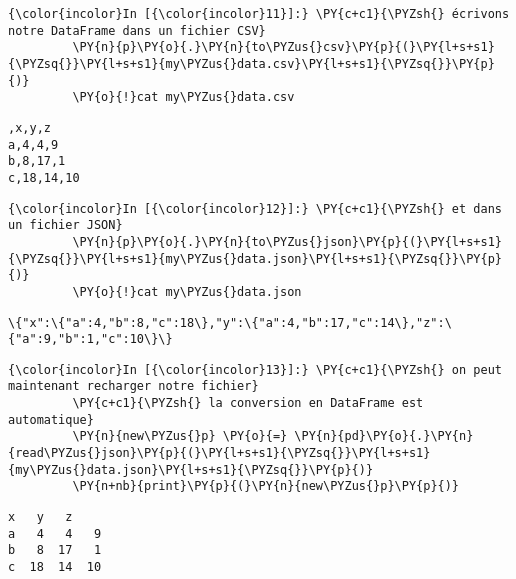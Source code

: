     \begin{Verbatim}[commandchars=\\\{\},frame=single,framerule=0.3mm,rulecolor=\color{cellframecolor}]
{\color{incolor}In [{\color{incolor}11}]:} \PY{c+c1}{\PYZsh{} écrivons notre DataFrame dans un fichier CSV}
         \PY{n}{p}\PY{o}{.}\PY{n}{to\PYZus{}csv}\PY{p}{(}\PY{l+s+s1}{\PYZsq{}}\PY{l+s+s1}{my\PYZus{}data.csv}\PY{l+s+s1}{\PYZsq{}}\PY{p}{)}
         \PY{o}{!}cat my\PYZus{}data.csv
\end{Verbatim}


    \begin{Verbatim}[commandchars=\\\{\},frame=single,framerule=0.3mm,rulecolor=\color{cellframecolor}]
,x,y,z
a,4,4,9
b,8,17,1
c,18,14,10
\end{Verbatim}

    \begin{Verbatim}[commandchars=\\\{\},frame=single,framerule=0.3mm,rulecolor=\color{cellframecolor}]
{\color{incolor}In [{\color{incolor}12}]:} \PY{c+c1}{\PYZsh{} et dans un fichier JSON}
         \PY{n}{p}\PY{o}{.}\PY{n}{to\PYZus{}json}\PY{p}{(}\PY{l+s+s1}{\PYZsq{}}\PY{l+s+s1}{my\PYZus{}data.json}\PY{l+s+s1}{\PYZsq{}}\PY{p}{)}
         \PY{o}{!}cat my\PYZus{}data.json
\end{Verbatim}


    \begin{Verbatim}[commandchars=\\\{\},frame=single,framerule=0.3mm,rulecolor=\color{cellframecolor}]
\{"x":\{"a":4,"b":8,"c":18\},"y":\{"a":4,"b":17,"c":14\},"z":\{"a":9,"b":1,"c":10\}\}
\end{Verbatim}

    \begin{Verbatim}[commandchars=\\\{\},frame=single,framerule=0.3mm,rulecolor=\color{cellframecolor}]
{\color{incolor}In [{\color{incolor}13}]:} \PY{c+c1}{\PYZsh{} on peut maintenant recharger notre fichier}
         \PY{c+c1}{\PYZsh{} la conversion en DataFrame est automatique}
         \PY{n}{new\PYZus{}p} \PY{o}{=} \PY{n}{pd}\PY{o}{.}\PY{n}{read\PYZus{}json}\PY{p}{(}\PY{l+s+s1}{\PYZsq{}}\PY{l+s+s1}{my\PYZus{}data.json}\PY{l+s+s1}{\PYZsq{}}\PY{p}{)}
         \PY{n+nb}{print}\PY{p}{(}\PY{n}{new\PYZus{}p}\PY{p}{)}
\end{Verbatim}


    \begin{Verbatim}[commandchars=\\\{\},frame=single,framerule=0.3mm,rulecolor=\color{cellframecolor}]
    x   y   z
a   4   4   9
b   8  17   1
c  18  14  10
\end{Verbatim}

